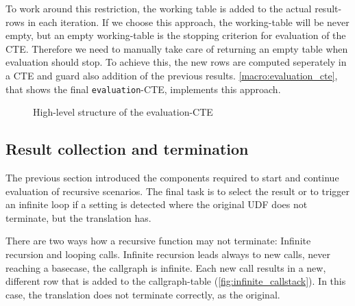 To work around this restriction, the working table is added to the actual result-rows in each iteration. If we choose this approach, the working-table will be never empty, but an empty working-table is the stopping criterion for evaluation of the CTE. Therefore we need to manually take care of returning an empty table when evaluation should stop. To achieve this, the new rows are computed seperately in a CTE and guard also addition of the previous results. \autoref{macro:evaluation_cte}, that shows the final \texttt{evaluation}-CTE, implements this approach.

\begin{figure}[h!]
  \caption{High-level structure of the evaluation-CTE}\label{macro:evaluation_cte}
\end{figure}


\FloatBarrier
\subsection{Result collection and termination}

The previous section introduced the components required to start and continue evaluation of recursive scenarios. The final task is to select the result or to trigger an infinite loop if a setting is detected where the original UDF does not terminate, but the translation has.

There are two ways how a recursive function may not terminate: Infinite recursion and looping calls. Infinite recursion leads always to new calls, never reaching a basecase, the callgraph is infinite. Each new call results in a new, different row that is added to the callgraph-table (\autoref{fig:infinite_callstack}). In this case, the translation does not terminate correctly, as the original.


